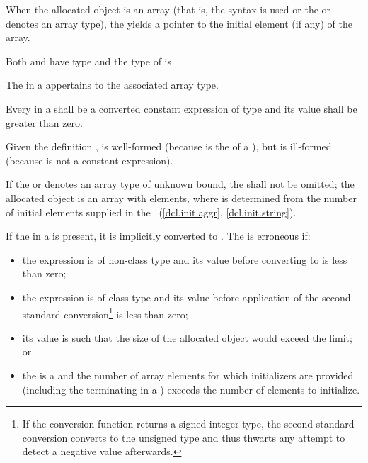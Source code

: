 \pnum
{}%
When the allocated object is an array (that is, the
 syntax is used or the
 or  denotes an array type), the
 yields a pointer to the initial element (if
any) of the array.
\begin{note}
Both  and  have type  and
the type of  is 
\end{note}
The  in a  appertains
to the associated array type.

\pnum
Every  in a
 shall be a converted constant
expression of type  and
its value shall be greater than zero.
\begin{example}
Given the definition ,
 is well-formed (because  is the
 of a ), but
 is ill-formed (because  is not a
constant expression).
\end{example}

\pnum
If the  or 
denotes an array type of unknown bound,
the  shall not be omitted;
the allocated object is an array with  elements,
where  is determined from the number of initial elements
supplied in
the ~(\ref{dcl.init.aggr}, \ref{dcl.init.string}).

\pnum
{}%
If the  in a 
is present, it is implicitly converted to .
%
The  is erroneous if:
\begin{itemize}
\item
the expression is of non-class type and its value before converting to
 is less than zero;

\item
the expression is of class type and its value before application of the second
standard conversion\footnote{If the conversion function
returns a signed integer type, the second standard conversion converts to the
unsigned type  and thus thwarts any attempt to detect a
negative value afterwards.} is less than zero;

\item
its value is such that the size of the allocated object would exceed the
 limit; or

\item
the  is a  and the
number of array elements for which initializers are provided (including the
terminating  in a ) exceeds the
number of elements to initialize.
\end{itemize}

